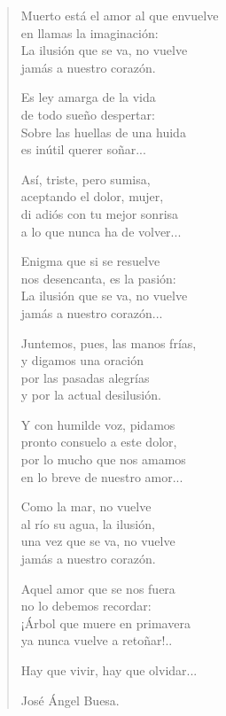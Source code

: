 \documentclass[11pt, portrait, twoside, notitlepage, openright]{book}
\begin{document}
\begin{verse}
Muerto está el amor al que envuelve\\
en llamas la imaginación:\\
La ilusión que se va, no vuelve\\
jamás a nuestro corazón.
\newline

Es ley amarga de la vida\\
de todo sueño despertar:\\
Sobre las huellas de una huida\\
es inútil querer soñar...
\newline

Así, triste, pero sumisa,\\
aceptando el dolor, mujer,\\
di adiós con tu mejor sonrisa\\
a lo que nunca ha de volver...
\newpage

Enigma que si se resuelve\\
nos desencanta, es la pasión:\\
La ilusión que se va, no vuelve\\
jamás a nuestro corazón...
\newline

Juntemos, pues, las manos frías,\\
y digamos una oración\\
por las pasadas alegrías\\
y por la actual desilusión.
\newline

Y con humilde voz, pidamos\\
pronto consuelo a este dolor,\\
por lo mucho que nos amamos\\
en lo breve de nuestro amor...
\newline

Como la mar, no vuelve\\
al río su agua, la ilusión,\\
una vez que se va, no vuelve\\
jamás a nuestro corazón.
\newpage

Aquel amor que se nos fuera\\
no lo debemos recordar:\\
¡Árbol que muere en primavera\\
ya nunca vuelve a retoñar!..
\newline

Hay que vivir, hay que olvidar...
\newline

José Ángel Buesa.
\end{verse}
\end{document}
